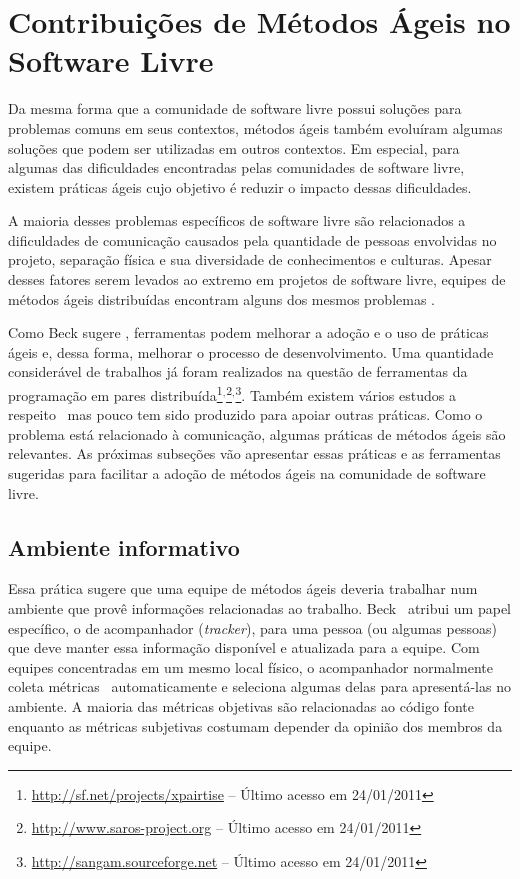 \section{Contribuições de Métodos Ágeis no Software Livre}
\label{sec:agile-improve-os}

Da mesma forma que a comunidade de software livre possui soluções para
problemas comuns em seus contextos, métodos ágeis também evoluíram
algumas soluções que podem ser utilizadas em outros contextos. Em
especial, para algumas das dificuldades encontradas pelas comunidades
de software livre, existem práticas ágeis cujo objetivo é reduzir o
impacto dessas dificuldades.

A maioria desses problemas específicos de software livre são
relacionados a dificuldades de comunicação causados pela quantidade de
pessoas envolvidas no projeto, separação física e sua diversidade de
conhecimentos e culturas. Apesar desses fatores serem levados ao
extremo em projetos de software livre, equipes de métodos ágeis
distribuídas encontram alguns dos mesmos problemas
\cite{Sutherland2007,Maurer2002}.

Como Beck sugere \cite{Beck2008}, ferramentas podem melhorar a adoção
e o uso de práticas ágeis e, dessa forma, melhorar o processo de
desenvolvimento. Uma quantidade considerável de trabalhos já foram
realizados na questão de ferramentas da programação em pares
distribuída\footnote{\url{http://sf.net/projects/xpairtise} -- Último
  acesso em
  24/01/2011}$^{,}$\footnote{\url{http://www.saros-project.org} --
  Último acesso em
  24/01/2011}$^{,}$\footnote{\url{http://sangam.sourceforge.net} --
  Último acesso em 24/01/2011}. Também existem vários estudos a
respeito~\cite{Nagappan2003} mas pouco tem sido produzido para apoiar
outras práticas. Como o problema está relacionado à comunicação,
algumas práticas de métodos ágeis são relevantes. As próximas
subseções vão apresentar essas práticas e as ferramentas sugeridas
para facilitar a adoção de métodos ágeis na comunidade de software
livre.

\subsection{Ambiente informativo}
\label{subsec:inform-worksp}

Essa prática sugere que uma equipe de métodos ágeis deveria trabalhar
num ambiente que provê informações relacionadas ao
trabalho. Beck~\cite{XP01} atribui um papel específico, o de
acompanhador (\emph{tracker}), para uma pessoa (ou algumas pessoas)
que deve manter essa informação disponível e atualizada para a
equipe. Com equipes concentradas em um mesmo local físico, o
acompanhador normalmente coleta métricas~\cite{Sato2007}
automaticamente e seleciona algumas delas para apresentá-las no
ambiente. A maioria das métricas objetivas são relacionadas ao código
fonte enquanto as métricas subjetivas costumam depender da opinião dos
membros da equipe.

